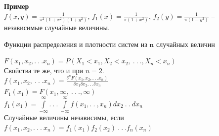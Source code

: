 \documentclass[russian, 12pt, fleqn]{article}
\begin{document}
\textbf{Пример} \\
$f(x, y) = \frac{1}{\pi^2(1+x^2)(1+y^2)}$, $f_1(x) = \frac{1}{\pi(1+x^2)}$, $f_2(y) = \frac{1}{\pi(1+y^2)}$ -- независимые случайные величины.
\begin{center}
$\textbf{Функции распределения и плотности систем из n случайных величин}$\\
\end{center}
 $F(x_1, x_2, .\ .\ . x_n) = P(X_1 < x_1, X_2 < x_2,\ .\ .\ .,X_n < x_n)$\\
Свойства те же, что и при $n = 2$.\\
$f(x_1, x_2, \ .\ .\ .x_n) = \frac{\delta^nF(x_1, x_2, .\ .\ . x_n)}{\delta x_1 \delta x_2 .\ .\ . \delta x_n}$ \\
$F_1(x_1) = F(x_1, \infty, \ .\ .\ ., \infty)$\\
$f_1(x_1) =  \displaystyle{\int \limits_{-\infty}^{\infty}}.\ .\ .\  \displaystyle{\int \limits_{-\infty}^{\infty}} f(x_1, .\  .\ , x_n) dx_2\ .\ .\ dx_n$\\
Случайные величины независимы, если $f(x_1, x_2, .\ .\ .\ x_n)  = f_1(x_1)  f_2(x_2)\ .\ .\ . f_n(x_n)$\\
\end{document}
